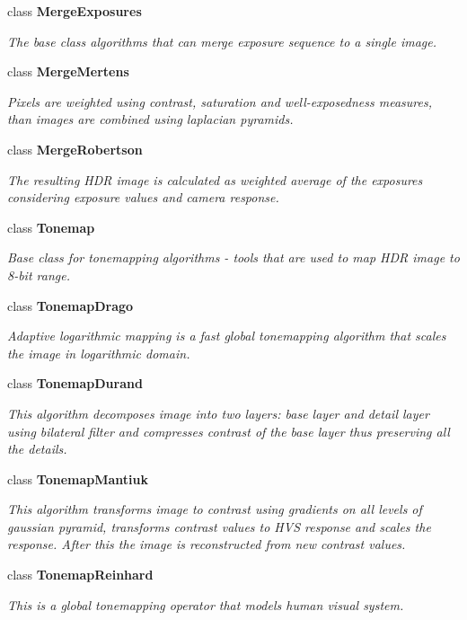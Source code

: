 \begin{DoxyCompactItemize}
class {\bfseries Merge\+Exposures}
\begin{DoxyCompactList}\small\item\em The base class algorithms that can merge exposure sequence to a single image. \end{DoxyCompactList}\item 
class {\bfseries Merge\+Mertens}
\begin{DoxyCompactList}\small\item\em Pixels are weighted using contrast, saturation and well-\/exposedness measures, than images are combined using laplacian pyramids. \end{DoxyCompactList}\item 
class {\bfseries Merge\+Robertson}
\begin{DoxyCompactList}\small\item\em The resulting H\+DR image is calculated as weighted average of the exposures considering exposure values and camera response. \end{DoxyCompactList}\item 
class {\bfseries Tonemap}
\begin{DoxyCompactList}\small\item\em Base class for tonemapping algorithms -\/ tools that are used to map H\+DR image to 8-\/bit range. \end{DoxyCompactList}\item 
class {\bfseries Tonemap\+Drago}
\begin{DoxyCompactList}\small\item\em Adaptive logarithmic mapping is a fast global tonemapping algorithm that scales the image in logarithmic domain. \end{DoxyCompactList}\item 
class {\bfseries Tonemap\+Durand}
\begin{DoxyCompactList}\small\item\em This algorithm decomposes image into two layers\+: base layer and detail layer using bilateral filter and compresses contrast of the base layer thus preserving all the details. \end{DoxyCompactList}\item 
class {\bfseries Tonemap\+Mantiuk}
\begin{DoxyCompactList}\small\item\em This algorithm transforms image to contrast using gradients on all levels of gaussian pyramid, transforms contrast values to H\+VS response and scales the response. After this the image is reconstructed from new contrast values. \end{DoxyCompactList}\item 
class {\bfseries Tonemap\+Reinhard}
\begin{DoxyCompactList}\small\item\em This is a global tonemapping operator that models human visual system. \end{DoxyCompactList}\end{DoxyCompactItemize}
